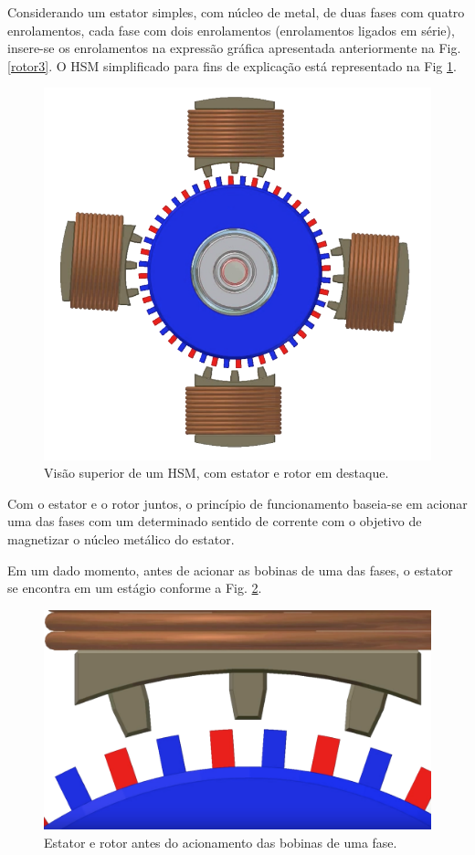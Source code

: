	Considerando um estator simples, com núcleo de metal, de duas fases com quatro enrolamentos, cada fase com dois enrolamentos (enrolamentos ligados em série), insere-se os enrolamentos na expressão gráfica apresentada anteriormente na Fig. \ref{rotor3}. O HSM simplificado para fins de explicação está representado na Fig \ref{hsm_superior}. 
	
	 \begin{figure}[H]
		\centering 
		\includegraphics[scale=0.3]{images/hsm_operation/etapa1}
		\caption{Visão superior de um HSM, com estator e rotor em destaque.}
		\label{hsm_superior}
	\end{figure}
	
	Com o estator e o rotor juntos, o princípio de funcionamento baseia-se em acionar uma das fases com um determinado sentido de corrente com o objetivo de magnetizar o núcleo metálico do estator.
	
	Em um dado momento, antes de acionar as bobinas de uma das fases, o estator se encontra em um estágio conforme a Fig. \ref{passo1}. 
	
	\begin{figure}[H]
		\centering 
		\includegraphics[scale=0.16]{images/hsm_operation/visaopasso1}
		\caption{Estator e rotor antes do acionamento das bobinas de uma fase.}
		\label{passo1}
	\end{figure}
	
